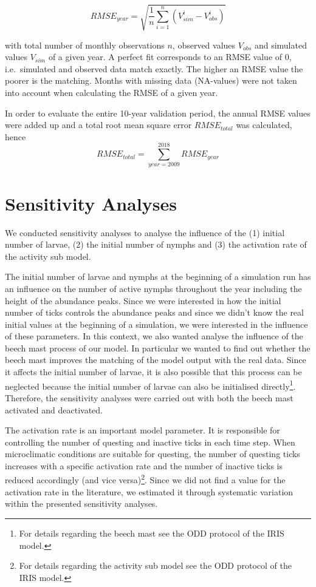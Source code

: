 \documentclass[a4paper, 11pt]{scrartcl}
\begin{document}
\begin{equation}\label{eq:rmse}
RMSE_{year} = \sqrt{ \frac{1}{n} \sum_{i=1}^n (V_{sim}^i - V_{obs}^i)}
\end{equation}

with total number of monthly observations $n$, observed values $V_{obs}$ and simulated values $V_{sim}$ of a given year. A perfect fit corresponds to an RMSE value of 0, i.e.\
simulated and observed data match exactly. The higher an RMSE value the poorer is the matching. Months with missing data (NA-values) were not taken into account when
calculating the RMSE of a given year.

In order to evaluate the entire 10-year validation period, the annual RMSE values were added up and a total root mean square error $RMSE_{total}$ was calculated, hence
\begin{equation}\label{eq:total_rmse}
RMSE_{total} = \sum_{year=2009}^{2018} RMSE_{year}
\end{equation}


\section{Sensitivity Analyses}
We conducted sensitivity analyses to analyse the influence of the (1) initial number of larvae, (2) the initial number of nymphs and (3) the activation rate of the activity sub
model.

The initial number of larvae and nymphs at the beginning of a simulation run has an influence on the number of active nymphs throughout the year including the height of the
abundance peaks. Since we were interested in how the initial number of ticks controls the abundance peaks and since we didn't know the real initial values at the beginning of a
simulation, we were interested in the influence of these parameters. In this context, we also wanted analyse the influence of the beech mast process of our model. In
particular we wanted to find out whether the beech mast improves the matching of the model output with the real data. Since it affects the initial number of larvae, it
is also possible that this process can be neglected because the initial number of larvae can also be initialised directly\footnote{For details regarding the beech mast
see the ODD protocol of the IRIS model.}. Therefore, the sensitivity analyses were carried out with both the beech mast activated and deactivated.

The activation rate is an important model parameter. It is responsible for controlling the number of questing and inactive ticks in each time step. When microclimatic
conditions are suitable for questing, the number of questing ticks increases with a specific activation rate and the number of inactive ticks is reduced accordingly (and vice
versa)\footnote{For details regarding the activity sub model see the ODD protocol of the IRIS model.}. Since we did not find a value for the activation
rate in the literature, we estimated it through systematic variation within the presented sensitivity analyses.
\end{document}
